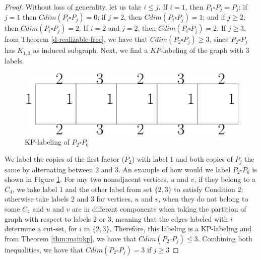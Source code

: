 \documentclass[12pt,a4paper,titlepage,openany]{report}
\begin{document}
\begin{proof}

 Without loss of generality, let us take $i\leq j$.\newline
 If $i=1$, then $P_1\square P_j=P_j$; if $j=1$ then $Cdim(P_i\square P_j)=0$; if $j=2$, then $Cdim(P_i\square P_j)=1$; and if $j\geq 2$, then $Cdim(P_i\square P_j)=2$.\newline 
If $i=2$ and $j=2$, then $Cdim(P_i\square P_j)=2$.
\newline
If $j\geq 3$, from Theorem \ref{d-realizable-free}, we have that $Cdim(P_2\square P_j)\geq 3$, since $P_2 \square P_j$ has $K_{1,3}$ as induced subgraph.\newline
Next, we find a $KP$-labeling of the graph with 3 labels.
\begin{figure}[h]
\begin{center}
\includegraphics[width=1\linewidth]{figures/p_2sqp_j.png}
\end{center}
\caption{KP-labeling of $P_2\square P_6$}\label{fig:P_2sqP_6}
\end{figure}\newline
We label the copies of the first factor ($P_2$) with label 1 and both copies of $P_j$ the same by alternating between 2 and 3.
An example of how would we label $P_2\square P_6$ is shown in Figure \ref{fig:P_2sqP_6}.\newline
For any two nonadjacent vertices, $u$ and $v$, if they belong to a $C_4$, we take label 1 and the other label from set $\{2,3\}$ to satisfy Condition 2; otherwise take labels 2 and 3 for vertices, $u$ and $v$, when they do not belong to some $C_4$ and $u$ and $v$ are in different components when taking the partition of graph with respect to labels 2 or 3, meaning that the edges labeled with $i$ determine a cut-set, for $i$ in $\{2,3\}$.\newline
Therefore, this labeling is a KP-labeling and from Theorem \ref{thm:mainkp}, we have that $Cdim(P_2\square P_j)\leq 3$.\newline
Combining both inequalities, we have that $Cdim(P_2\square P_j)=3$ if $j\geq 3$




\end{proof}
\end{document}
